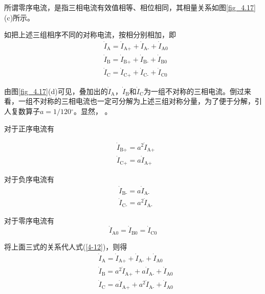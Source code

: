 \documentclass{book}
\begin{document}
所谓零序电流，是指三相电流有效值相等、相位相同，其相量关系如图\ref{fig_4.17}(c)所示。

如把上述三组相序不同的对称电流，按相分别相加，即
\begin{align}
& {{{\dot{I}}}_{\text{A}}}={{{\dot{I}}}_{\text{A+}}}+{{{\dot{I}}}_{\text{A-}}}+{{{\dot{I}}}_{\text{A0}}} \\ 
& {{{\dot{I}}}_{\text{B}}}={{{\dot{I}}}_{\text{B+}}}+{{{\dot{I}}}_{\text{B-}}}+{{{\dot{I}}}_{\text{B0}}} \\ 
& {{{\dot{I}}}_{\text{C}}}={{{\dot{I}}}_{\text{C+}}}+{{{\dot{I}}}_{\text{C-}}}+{{{\dot{I}}}_{\text{C0}}}
\label{4-12}
\end{align}

由图\ref{fig_4.17}(d)可见，叠加出的${{\dot{I}}_{\text{A}}}$，${{\dot{I}}_{\text{B}}}$和${{\dot{I}}_{\text{C}}}$为一组不对称的三相电流。倒过来看，一组不对称的三相电流也一定可分解为上述三组对称分量，为了便于分解，引人复数算子$a=1/120{}^\circ $。显然， 。

对于正序电流有


\begin{align}
& {{{\dot{I}}}_{\text{B+}}}={{a}^{2}}{{{\dot{I}}}_{\text{A+}}} \\ 
& {{{\dot{I}}}_{\text{C+}}}=a{{{\dot{I}}}_{\text{A+}}} 
\label{4-13}
\end{align}

对于负序电流有
\begin{align}
& {{{\dot{I}}}_{\text{B-}}}=a{{{\dot{I}}}_{\text{A-}}} \\ 
& {{{\dot{I}}}_{\text{C-}}}={{a}^{2}}{{{\dot{I}}}_{\text{A-}}}
\label{4-14}
\end{align}

对于零序电流有
\begin{equation}
{{\dot{I}}_{\text{A0}}}={{\dot{I}}_{\text{B0}}}={{\dot{I}}_{\text{C0}}}
\label{4-15}
\end{equation}

将上面三式的关系代人式(\ref{4-12})，则得
\begin{align}
& {{{\dot{I}}}_{\text{A}}}={{{\dot{I}}}_{\text{A+}}}+{{{\dot{I}}}_{\text{A-}}}+{{{\dot{I}}}_{\text{A0}}} \\ 
& {{{\dot{I}}}_{\text{B}}}={{a}^{2}}{{{\dot{I}}}_{\text{A+}}}+a{{{\dot{I}}}_{\text{A-}}}+{{{\dot{I}}}_{\text{A0}}} \\ 
& {{{\dot{I}}}_{\text{C}}}=a{{{\dot{I}}}_{\text{A+}}}+{{a}^{2}}{{{\dot{I}}}_{\text{A-}}}+{{{\dot{I}}}_{\text{A0}}}
\label{4-16}
\end{align}
\end{document}
